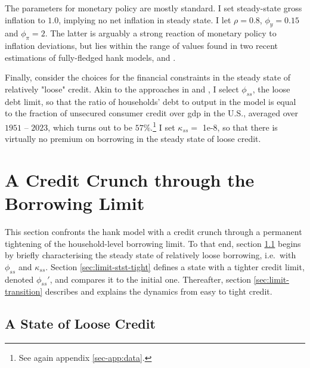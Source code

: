 \documentclass[a4paper,12pt]{article} %
\numberwithin{equation}{section} %
\numberwithin{figure}{section}
\numberwithin{table}{section}
\begin{document}
The parameters for monetary policy are mostly standard. I set steady-state gross inflation to $1.0$, implying no net inflation in steady state. I let $\rho = 0.8$, $\phi_y = 0.15$ and $\phi_{\pi} = 2$. The latter is arguably a strong reaction of monetary policy to inflation deviations, but lies within the range of values found in two recent estimations of fully-fledged \Gls{hank} models, \textcite{boehl2022} and \textcite{bayer2023}.

Finally, consider the choices for the financial constraints in the steady state of relatively "loose" credit. Akin to the approaches in \textcite{gl2017} and \textcite{bayer2023}, I select $\phi_{ss}$, the loose debt limit, so that the ratio of households' debt to output in the model is equal to the fraction of unsecured consumer credit over \Gls{gdp} in the U.S., averaged over $1951$ -- $2023$, which turns out to be $57\%$.\footnote{See again appendix \ref{sec-app:data}.} I set $\kappa_{ss} =$ 1e-8, so that there is virtually no premium on borrowing in the steady state of loose credit. %

\section{A Credit Crunch through the Borrowing Limit}
\label{sec:limit}

This section confronts the \Gls{hank} model with a credit crunch through a permanent tightening of the household-level borrowing limit. To that end, section \ref{sec:limit-stst-loose} begins by briefly characterising the steady state of relatively loose borrowing, i.e.~with $\phi_{ss}$ and $\kappa_{ss}$. Section \ref{sec:limit-stst-tight} defines a state with a tighter credit limit, denoted $\phi_{ss}'$, and compares it to the initial one. Thereafter, section \ref{sec:limit-transition} describes and explains the dynamics from easy to tight credit.

\subsection{A State of Loose Credit}
\label{sec:limit-stst-loose}
\end{document}
